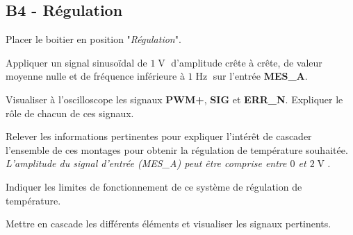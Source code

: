 \documentclass[a4paper,11pt]{article}
\begin{document}
\subsection*{B4 - Régulation}


\Real Placer le boitier en position "\textit{Régulation}".

\Real Appliquer un signal sinusoïdal de $1\operatorname{V}$ d'amplitude crête à crête, de valeur moyenne nulle et de fréquence inférieure à $1\operatorname{Hz}$ sur l'entrée \textbf{\textsc{MES\_A}}.

\Real Visualiser à l'oscilloscope les signaux \textbf{\textsc{PWM+}}, \textbf{\textsc{SIG}} et \textbf{\textsc{ERR\_N}}. Expliquer le rôle de chacun de ces signaux.

\Real Relever les informations pertinentes pour expliquer l'intérêt de cascader l'ensemble de ces montages pour obtenir la régulation de température souhaitée. \textit{L'amplitude du signal d'entrée (\textit{MES\_A}) peut être comprise entre $0$ et $2\operatorname{V}$.}

\Real Indiquer les limites de fonctionnement de ce système de régulation de température.

\Real Mettre en cascade les différents éléments et visualiser les signaux pertinents.




\end{document}
